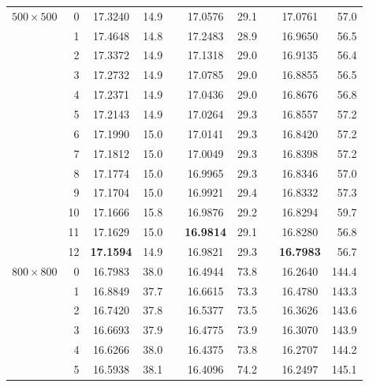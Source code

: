 \begin{table}[p!]
{\begin{tabular}{crcrlcrlcr}
\hline
$500\times 500$ &  0 &      17.3240  & 14.9 &  &      17.0576  & 29.1 &  &      17.0761  &  57.0 \\
                &  1 &      17.4648  & 14.8 &  &      17.2483  & 28.9 &  &      16.9650  &  56.5 \\
                &  2 &      17.3372  & 14.9 &  &      17.1318  & 29.0 &  &      16.9135  &  56.4 \\
                &  3 &      17.2732  & 14.9 &  &      17.0785  & 29.0 &  &      16.8855  &  56.5 \\
                &  4 &      17.2371  & 14.9 &  &      17.0436  & 29.0 &  &      16.8676  &  56.8 \\
                &  5 &      17.2143  & 14.9 &  &      17.0264  & 29.3 &  &      16.8557  &  57.2 \\
                &  6 &      17.1990  & 15.0 &  &      17.0141  & 29.3 &  &      16.8420  &  57.2 \\
                &  7 &      17.1812  & 15.0 &  &      17.0049  & 29.3 &  &      16.8398  &  57.2 \\
                &  8 &      17.1774  & 15.0 &  &      16.9965  & 29.3 &  &      16.8346  &  57.0 \\
                &  9 &      17.1704  & 15.0 &  &      16.9921  & 29.4 &  &      16.8332  &  57.3 \\
                & 10 &      17.1666  & 15.8 &  &      16.9876  & 29.2 &  &      16.8294  &  59.7 \\
                & 11 &      17.1629  & 15.0 &  & {\bf 16.9814} & 29.1 &  &      16.8280  &  56.8 \\
                & 12 & {\bf 17.1594} & 14.9 &  &      16.9821  & 29.3 &  & {\bf 16.7983} &  56.7 \\
\hline
$800\times 800$ &  0 &      16.7983  & 38.0 &  &      16.4944  & 73.8 &  &      16.2640  & 144.4 \\
                &  1 &      16.8849  & 37.7 &  &      16.6615  & 73.3 &  &      16.4780  & 143.3 \\
                &  2 &      16.7420  & 37.8 &  &      16.5377  & 73.5 &  &      16.3626  & 143.6 \\
                &  3 &      16.6693  & 37.9 &  &      16.4775  & 73.9 &  &      16.3070  & 143.9 \\
                &  4 &      16.6266  & 38.0 &  &      16.4375  & 73.8 &  &      16.2707  & 144.2 \\
                &  5 &      16.5938  & 38.1 &  &      16.4096  & 74.2 &  &      16.2497  & 145.1 \\

\end{tabular}}
\end{table}
